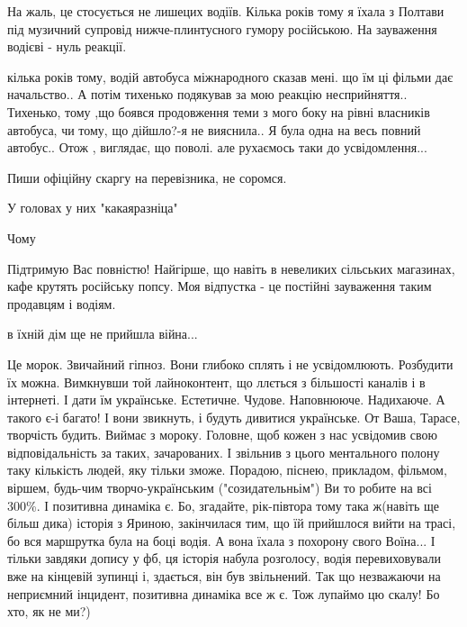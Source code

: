 \begin{itemize}

На жаль, це стосується не лишецих водіїв. Кілька років тому я їхала з Полтави
під музичний супровід нижче-плинтусного гумору російською. На зауваження
водієві - нуль реакції.


кілька років тому, водій автобуса міжнародного сказав мені. що їм ці фільми дає
начальство.. А потім тихенько подякував за мою реакцію
несприйняття.. Тихенько, тому ,що боявся продовження теми з мого боку на рівні
власників автобуса, чи тому, що дійшло?-я не вияснила.. Я була одна на весь
повний автобус.. Отож , виглядає, що поволі. але рухаємось таки до
усвідомлення...


Пиши офіційну скаргу на перевізника, не соромся.

У головах у них "какаяразніца"

Чому


Підтримую Вас повністю! Найгірше, що навіть в невеликих сільських магазинах,
кафе крутять російську попсу. Моя відпустка - це постійні зауваження таким
продавцям і водіям.


в їхній дім ще не прийшла війна...


\obeycr
Це морок.
Звичайний гіпноз.
Вони глибоко сплять і не усвідомлюють.
Розбудити їх можна.
Вимкнувши той лайноконтент, що ллється з більшості каналів і в інтернеті. І дати їм українське. Естетичне. Чудове. Наповнююче. Надихаюче. А такого є-і багато!
І вони звикнуть, і будуть дивитися українське.
От Ваша, Тарасе, творчість будить. Виймає з мороку.
Головне, щоб кожен з нас усвідомив свою відповідальність за таких, зачарованих.
І звільнив з цього ментального полону таку кількість людей, яку тільки зможе.
Порадою, піснею, прикладом, фільмом, віршем, будь-чим творчо-українським ("созидательньім")
Ви то робите на всі 300\%.
І позитивна динаміка є.
Бо, згадайте, рік-півтора тому така ж(навіть ще більш дика) історія з Яриною, закінчилася тим, що їй прийшлося вийти на трасі, бо вся маршрутка була на боці водія.
А вона їхала з похорону свого Воїна...
І тільки завдяки допису у фб, ця історія набула розголосу, водія перевиховували вже на кінцевій зупинці і, здається, він був звільнений.
Так що незважаючи на неприємний інцидент, позитивна динаміка все ж є.
Тож лупаймо цю скалу!
Бо хто, як не ми?)
\restorecr


\end{itemize}
